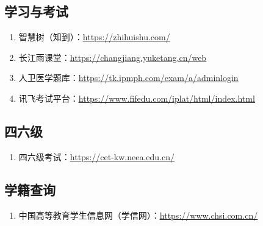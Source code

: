\subsection[学习与考试]{学习与考试}
\begin{enumerate}
    \item 智慧树（知到）：\uline{\href{https://zhihuishu.com/}{https://zhihuishu.com/}}
    \item 长江雨课堂：\uline{\href{https://changjiang.yuketang.cn/web}{https://changjiang.yuketang.cn/web}}
    \item 人卫医学题库：\uline{\href{https://tk.ipmph.com/exam/a/adminlogin}{https://tk.ipmph.com/exam/a/adminlogin}}
    \item 讯飞考试平台：\uline{\href{https://www.fifedu.com/iplat/html/index.html}{https://www.fifedu.com/iplat/html/index.html}}
\end{enumerate}

\subsection[四六级]{四六级}
\begin{enumerate}
    \item 四六级考试：\uline{\href{https://cet-kw.neea.edu.cn/}{https://cet-kw.neea.edu.cn/}}
\end{enumerate}

\subsection[学籍查询]{学籍查询}
\label{student_status_query}
\begin{enumerate}
    \item 中国高等教育学生信息网（学信网）：\uline{\href{https://www.chsi.com.cn/}{https://www.chsi.com.cn/}}
\end{enumerate}

